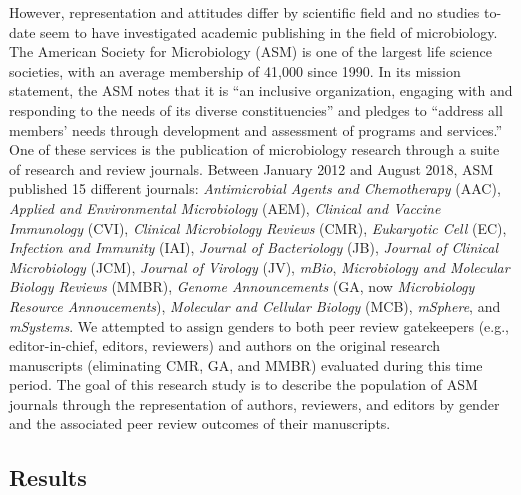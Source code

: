\documentclass[11pt,]{article}
\begin{document}
However, representation and attitudes differ by scientific field and no
studies to-date seem to have investigated academic publishing in the
field of microbiology. The American Society for Microbiology (ASM) is
one of the largest life science societies, with an average membership of
41,000 since 1990. In its mission statement, the ASM notes that it is
``an inclusive organization, engaging with and responding to the needs
of its diverse constituencies'' and pledges to ``address all members'
needs through development and assessment of programs and services.'' One
of these services is the publication of microbiology research through a
suite of research and review journals. Between January 2012 and August
2018, ASM published 15 different journals: \emph{Antimicrobial Agents
and Chemotherapy} (AAC), \emph{Applied and Environmental Microbiology}
(AEM), \emph{Clinical and Vaccine Immunology} (CVI), \emph{Clinical
Microbiology Reviews} (CMR), \emph{Eukaryotic Cell} (EC),
\emph{Infection and Immunity} (IAI), \emph{Journal of Bacteriology}
(JB), \emph{Journal of Clinical Microbiology} (JCM), \emph{Journal of
Virology} (JV), \emph{mBio}, \emph{Microbiology and Molecular Biology
Reviews} (MMBR), \emph{Genome Announcements} (GA, now \emph{Microbiology
Resource Annoucements}), \emph{Molecular and Cellular Biology} (MCB),
\emph{mSphere}, and \emph{mSystems}. We attempted to assign genders to
both peer review gatekeepers (e.g., editor-in-chief, editors, reviewers)
and authors on the original research manuscripts (eliminating CMR, GA,
and MMBR) evaluated during this time period. The goal of this research
study is to describe the population of ASM journals through the
representation of authors, reviewers, and editors by gender and the
associated peer review outcomes of their manuscripts.

\subsection{Results}\label{results}
\end{document}
